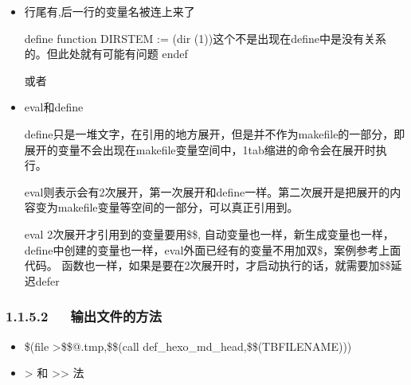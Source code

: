 \documentclass[letterpaper,12pt,english]{sphinxmanual}
\begin{document}
\begin{itemize}
\item {} 
行尾有,后一行的变量名被连上来了

\begin{sphinxVerbatim}[commandchars=\\\{\}]
define function
DIR\PYGZus{}STEM := \PYGZdl{}(dir \PYGZdl{}(1))\PYGZsh{}这个不是出现在define中是没有关系的。但此处就有可能有问题
endef
\end{sphinxVerbatim}

或者

\begin{sphinxVerbatim}[commandchars=\\\{\}]
  \PYGZbs{}\PYGZbs{}
\end{sphinxVerbatim}

\item {} 
eval和define

define只是一堆文字，在引用的地方展开，但是并不作为makefile的一部分，即展开的变量不会出现在makefile变量空间中，1tab缩进的命令会在展开时执行。

eval则表示会有2次展开，第一次展开和define一样。第二次展开是把展开的内容变为makefile变量等空间的一部分，可以真正引用到。

eval 2次展开才引用到的变量要用\$\$, 自动变量也一样，新生成变量也一样，define中创建的变量也一样，eval外面已经有的变量不用加双\$，案例参考上面代码。
函数也一样，如果是要在2次展开时，才启动执行的话，就需要加\$\$延迟defer

\end{itemize}


\subsubsection{1.1.5.2   输出文件的方法}
\label{\detokenize{001software/001install/make:id16}}\begin{itemize}
\item {} 
\$(file \textgreater{}\$\$@.tmp,\$\$(call def\_hexo\_md\_head,\$\$(TBFILENAME)))

\item {} 
\textgreater{} 和 \textgreater{}\textgreater{} 法

\end{itemize}
\end{document}
